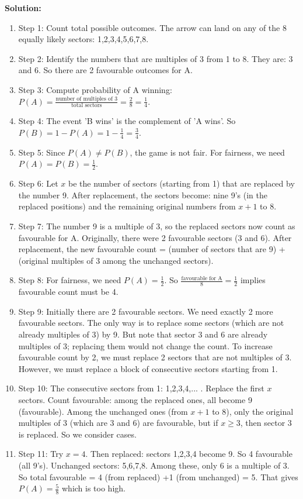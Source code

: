 \documentclass[12pt,a4paper]{exam}
\begin{document}
\begin{questions}
\textbf{Solution:}
\begin{enumerate}
  \item Step 1: Count total possible outcomes. The arrow can land on any of the 8 equally likely sectors: 1,2,3,4,5,6,7,8.
  \item Step 2: Identify the numbers that are multiples of 3 from 1 to 8. They are: 3 and 6. So there are 2 favourable outcomes for A.
  \item Step 3: Compute probability of A winning: $P(A) = \frac{\text{number of multiples of 3}}{\text{total sectors}} = \frac{2}{8} = \frac{1}{4}$.
  \item Step 4: The event 'B wins' is the complement of 'A wins'. So $P(B) = 1 - P(A) = 1 - \frac{1}{4} = \frac{3}{4}$.
  \item Step 5: Since $P(A) \neq P(B)$, the game is not fair. For fairness, we need $P(A) = P(B) = \frac{1}{2}$.
  \item Step 6: Let $x$ be the number of sectors (starting from 1) that are replaced by the number 9. After replacement, the sectors become: nine 9's (in the replaced positions) and the remaining original numbers from $x+1$ to 8.
  \item Step 7: The number 9 is a multiple of 3, so the replaced sectors now count as favourable for A. Originally, there were 2 favourable sectors (3 and 6). After replacement, the new favourable count = (number of sectors that are 9) + (original multiples of 3 among the unchanged sectors).
  \item Step 8: For fairness, we need $P(A) = \frac{1}{2}$. So $\frac{\text{favourable for A}}{8} = \frac{1}{2}$ implies favourable count must be 4.
  \item Step 9: Initially there are 2 favourable sectors. We need exactly 2 more favourable sectors. The only way is to replace some sectors (which are not already multiples of 3) by 9. But note that sector 3 and 6 are already multiples of 3; replacing them would not change the count. To increase favourable count by 2, we must replace 2 sectors that are not multiples of 3. However, we must replace a block of consecutive sectors starting from 1.
  \item Step 10: The consecutive sectors from 1: 1,2,3,4,... . Replace the first $x$ sectors. Count favourable: among the replaced ones, all become 9 (favourable). Among the unchanged ones (from $x+1$ to 8), only the original multiples of 3 (which are 3 and 6) are favourable, but if $x \ge 3$, then sector 3 is replaced. So we consider cases.
  \item Step 11: Try $x=4$. Then replaced: sectors 1,2,3,4 become 9. So 4 favourable (all 9's). Unchanged sectors: 5,6,7,8. Among these, only 6 is a multiple of 3. So total favourable = 4 (from replaced) +1 (from unchanged) = 5. That gives $P(A)=\frac{5}{8}$ which is too high.

\end{enumerate}
\end{questions}
\end{document}
